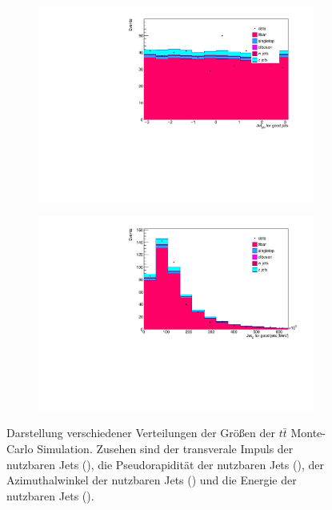 \begin{figure}[H]
\begin{subfigure}{0.5\textwidth}
    \includegraphics[width=\linewidth]{plots_and_txt/stacked_plots/stacked_jet_phi_good.pdf}
    \caption{}
    \label{fig:stacked_jet_pt_good3}
  \end{subfigure}%
  \begin{subfigure}{0.5\textwidth}
    \centering
    \includegraphics[width=\linewidth]{plots_and_txt/stacked_plots/stacked_jet_E_good.pdf}
    \caption{}
    \label{fig:stacked_met_et3}
  \end{subfigure}%
  \caption{Darstellung verschiedener Verteilungen der Größen der $t\bar{t}$ Monte-Carlo Simulation.
  Zusehen sind der transverale Impuls der nutzbaren Jets (), 
  die Pseudorapidität der nutzbaren Jets (), der Azimuthalwinkel der nutzbaren Jets () 
  und die Energie der nutzbaren Jets ().
  }
  \label{fig:stacked_Distributions3}
\end{figure}

